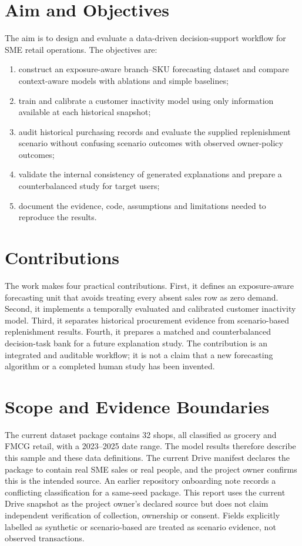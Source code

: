 \section{Aim and Objectives}
The aim is to design and evaluate a data-driven decision-support workflow for SME retail operations. The objectives are:
\begin{enumerate}
\item construct an exposure-aware branch--SKU forecasting dataset and compare context-aware models with ablations and simple baselines;
\item train and calibrate a customer inactivity model using only information available at each historical snapshot;
\item audit historical purchasing records and evaluate the supplied replenishment scenario without confusing scenario outcomes with observed owner-policy outcomes;
\item validate the internal consistency of generated explanations and prepare a counterbalanced study for target users;
\item document the evidence, code, assumptions and limitations needed to reproduce the results.
\end{enumerate}

\section{Contributions}
The work makes four practical contributions. First, it defines an exposure-aware forecasting unit that avoids treating every absent sales row as zero demand. Second, it implements a temporally evaluated and calibrated customer inactivity model. Third, it separates historical procurement evidence from scenario-based replenishment results. Fourth, it prepares a matched and counterbalanced decision-task bank for a future explanation study. The contribution is an integrated and auditable workflow; it is not a claim that a new forecasting algorithm or a completed human study has been invented.

\section{Scope and Evidence Boundaries}
The current dataset package contains 32 shops, all classified as grocery and FMCG retail, with a 2023--2025 date range. The model results therefore describe this sample and these data definitions. The current Drive manifest declares the package to contain real SME sales or real people, and the project owner confirms this is the intended source. An earlier repository onboarding note records a conflicting classification for a same-seed package. This report uses the current Drive snapshot as the project owner's declared source but does not claim independent verification of collection, ownership or consent. Fields explicitly labelled as synthetic or scenario-based are treated as scenario evidence, not observed transactions.


